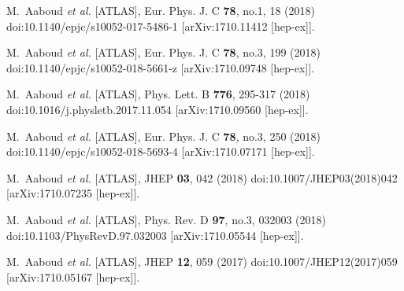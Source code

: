 \begin{thebibliography}{9}
M.~Aaboud \textit{et al.} [ATLAS],
Eur. Phys. J. C \textbf{78}, no.1, 18 (2018)
doi:10.1140/epjc/s10052-017-5486-1
[arXiv:1710.11412 [hep-ex]].

M.~Aaboud \textit{et al.} [ATLAS],
Eur. Phys. J. C \textbf{78}, no.3, 199 (2018)
doi:10.1140/epjc/s10052-018-5661-z
[arXiv:1710.09748 [hep-ex]].

M.~Aaboud \textit{et al.} [ATLAS],
Phys. Lett. B \textbf{776}, 295-317 (2018)
doi:10.1016/j.physletb.2017.11.054
[arXiv:1710.09560 [hep-ex]].

M.~Aaboud \textit{et al.} [ATLAS],
Eur. Phys. J. C \textbf{78}, no.3, 250 (2018)
doi:10.1140/epjc/s10052-018-5693-4
[arXiv:1710.07171 [hep-ex]].

M.~Aaboud \textit{et al.} [ATLAS],
JHEP \textbf{03}, 042 (2018)
doi:10.1007/JHEP03(2018)042
[arXiv:1710.07235 [hep-ex]].

M.~Aaboud \textit{et al.} [ATLAS],
Phys. Rev. D \textbf{97}, no.3, 032003 (2018)
doi:10.1103/PhysRevD.97.032003
[arXiv:1710.05544 [hep-ex]].

M.~Aaboud \textit{et al.} [ATLAS],
JHEP \textbf{12}, 059 (2017)
doi:10.1007/JHEP12(2017)059
[arXiv:1710.05167 [hep-ex]].


\end{thebibliography}
